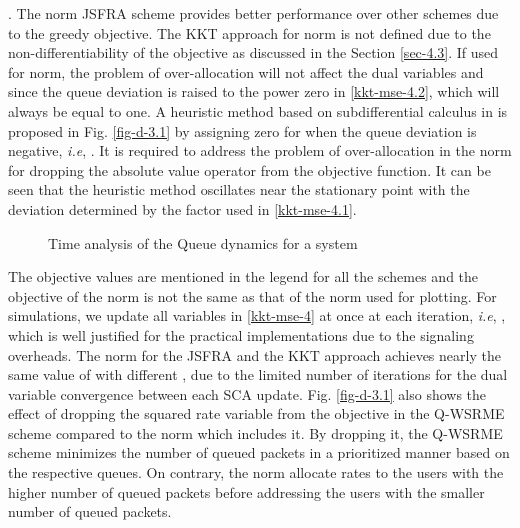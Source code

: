 . The  norm \ac{JSFRA} scheme provides better performance over other schemes due to the greedy objective. The \ac{KKT} approach for  norm is not defined due to the non-differentiability of the objective as discussed in the Section \ref{sec-4.3}. If used for  norm, the problem of over-allocation will not affect the dual variables  and  since the queue deviation is raised to the power zero in \eqref{kkt-mse-4.2}, which will always be equal to one. A heuristic method based on subdifferential calculus in \cite{bertsekas1999nonlinear} is proposed in Fig. \ref{fig-d-3.1} by assigning zero for  when the queue deviation is negative, \textit{i.e}, . It is required to address the problem of over-allocation in the  norm for dropping the absolute value operator from the objective function. It can be seen that the heuristic method oscillates near the stationary point with the deviation determined by the factor \me{\rho} used in \eqref{kkt-mse-4.1}.
\begin{figure*}
	\centering
	\hfill
	\caption{Time analysis of the Queue dynamics for a system }
	\label{fig-time-analysis}
\end{figure*}

The objective values are mentioned in the legend for all the schemes and the objective of the  norm is not the same as that of the  norm used for plotting. For simulations, we update all variables in \eqref{kkt-mse-4} at once at each iteration, \textit{i.e}, , which is well justified for the practical implementations due to the signaling overheads. The  norm for the \ac{JSFRA} and the \ac{KKT} approach achieves nearly the same value of  with different \me{\chi}, due to the limited number of iterations for the dual variable convergence between each \ac{SCA} update. Fig. \ref{fig-d-3.1} also shows the effect of dropping the squared rate variable from the objective in the \ac{Q-WSRME} scheme compared to the  norm which includes it. By dropping it, the \ac{Q-WSRME} scheme minimizes the number of queued packets in a prioritized manner based on the respective queues. On contrary, the  norm allocate rates to the users with the higher number of queued packets before addressing the users with the smaller number of queued packets.

